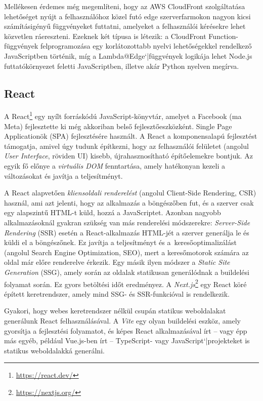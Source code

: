 Mellékesen érdemes még megemlíteni, hogy az AWS CloudFront szolgáltatása lehetőséget nyújt a felhasználóhoz közel futó edge szerverfarmokon nagyon kicsi számításigényű függvényeket futtatni, amelyeket a felhasználói kérésekre lehet közvetlen ráereszteni. Ezeknek két típusa is létezik: a CloudFront Function-függvények felprogramozása egy korlátozottabb nyelvi lehetőségekkel rendelkező JavaScriptben történik, míg a Lambda@Edge`|függvények logikája lehet Node.js futtatókörnyezet feletti JavaScriptben, illetve akár Python nyelven megírva.

\subsection{React}

A React\footnote{\url{https://react.dev/}} egy nyílt forráskódú JavaScript-könyvtár, amelyet a Facebook (ma Meta) fejlesztette ki még akkoriban belső fejlesztőeszközként. Single Page Applicationök (SPA) fejlesztésére használt. A React a komponensalapú fejlesztést támogatja, amivel úgy tudunk építkezni, hogy az felhasználói felületet (angolul \emph{User Interface}, röviden UI) kisebb, újrahasznosítható építőelemekre bontjuk. Az egyik fő előnye a \emph{virtuális DOM} fenntartása, amely hatékonyan kezeli a változásokat és javítja a teljesítményt.

A React alapvetően \emph{kliensoldali renderelést} (angolul Client-Side Rendering, CSR) használ, ami azt jelenti, hogy az alkalmazás a böngészőben fut, és a szerver csak egy alapszintű HTML-t küld, hozzá a JavaScriptet. Azonban nagyobb alkalmazásoknál gyakran szükség van más renderelési módszerekre: \emph{Server-Side Rendering} (SSR) esetén a React-alkalmazás HTML-jét a szerver generálja le és küldi el a böngészőnek. Ez javítja a teljesítményt és a~keresőoptimalizálást (angolul Search Engine Optimization, SEO), mert a keresőmotorok számára az oldal már előre renderelve érkezik. Egy másik ilyen módszer a \emph{Static Site Generation} (SSG), amely során az oldalak statikusan generálódnak a buildelési folyamat során. Ez gyors betöltési időt eredményez. A \emph{Next.js}\footnote{\url{https://nextjs.org/}} egy React köré épített keretrendszer, amely mind SSG- és SSR-funkcióval is rendelkezik.

Gyakori, hogy webes keretrendszer nélkül csupán statikus weboldalakat generálunk React felhasználásával. A \emph{Vite} egy olyan buildelési eszköz, amely gyorsítja a fejlesztési folyamatot, és képes React alkalmazásával írt -- vagy épp más egyéb, például Vue.js-ben írt -- TypeScript- vagy JavaScript`|projekteket is statikus weboldalakká generálni.

